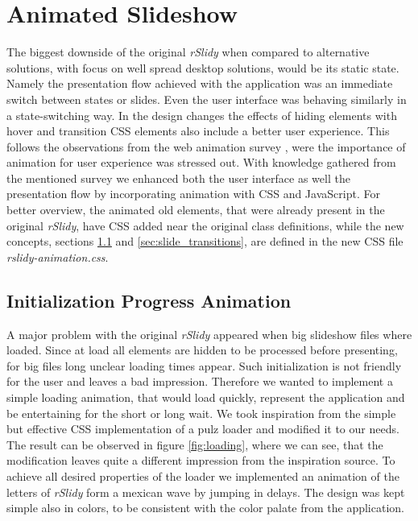 %
%
% 
% 
% 


\chapter{Animated Slideshow}

\label{chap:animated}

The biggest downside of the original \textit{rSlidy} when compared to 
alternative solutions, with focus on well spread desktop solutions, would be 
its static state. Namely the presentation flow achieved with the application 
was an immediate switch between states or slides. Even the user interface was 
behaving similarly in a state-switching way. In the design changes the effects 
of hiding elements with hover and transition CSS elements also include a better 
user experience. This follows the observations from the web animation survey 
\citet{WebAnime}, were the importance of animation for user experience was 
stressed out. With knowledge gathered from the mentioned survey we enhanced 
both the user interface as well the presentation flow by incorporating 
animation with CSS and JavaScript. For better overview, the animated old 
elements, that were already present in the original \textit{rSlidy}, have CSS 
added near the original class definitions, while the new concepts, sections 
\ref{sec:initialization} and \ref{sec:slide_transitions}, are defined in the 
new CSS file \textit{rslidy-animation.css}.

\section{Initialization Progress Animation} %
\label{sec:initialization}

A major problem with the original \textit{rSlidy} appeared when big slideshow 
files where loaded. Since at load all elements are hidden to be processed 
before presenting, for big files long unclear loading times appear. Such 
initialization is not friendly for the user and leaves a bad impression. 
Therefore we wanted to implement a simple loading animation, that would load 
quickly, represent the application and be entertaining for the short or long 
wait. We took inspiration from the simple but effective CSS implementation of a 
pulz loader\citep{WebAnime} and modified it to our needs. The result can be 
observed in figure \ref{fig:loading}, where we can see, that the modification 
leaves quite a different impression from the inspiration source. To achieve all 
desired properties of the loader we implemented an animation of the letters of 
\textit{rSlidy} form a mexican wave by jumping in delays. The design was kept 
simple also in colors, to be consistent with the color palate from the 
application.


